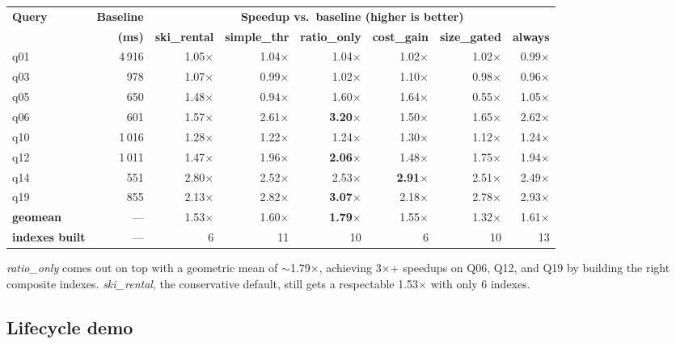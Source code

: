 \documentclass[10pt,a4paper]{article}
\begin{document}
\begin{table}[h]
\centering\small
\begin{tabular}{lrrrrrrr}
\toprule
\textbf{Query} & \textbf{Baseline} & \multicolumn{6}{c}{\textbf{Speedup vs.\ baseline (higher is better)}} \\
\cmidrule(lr){3-8}
                &  \textbf{(ms)} & \textbf{ski\_rental} & \textbf{simple\_thr} & \textbf{ratio\_only} & \textbf{cost\_gain} & \textbf{size\_gated} & \textbf{always} \\
\midrule
q01   & 4\,916  & 1.05$\times$ & 1.04$\times$ & 1.04$\times$ & 1.02$\times$ & 1.02$\times$ & 0.99$\times$ \\
q03   &   978   & 1.07$\times$ & 0.99$\times$ & 1.02$\times$ & 1.10$\times$ & 0.98$\times$ & 0.96$\times$ \\
q05   &   650   & 1.48$\times$ & 0.94$\times$ & 1.60$\times$ & 1.64$\times$ & 0.55$\times$ & 1.05$\times$ \\
q06   &   601   & 1.57$\times$ & 2.61$\times$ & \textbf{3.20$\times$} & 1.50$\times$ & 1.65$\times$ & 2.62$\times$ \\
q10   & 1\,016  & 1.28$\times$ & 1.22$\times$ & 1.24$\times$ & 1.30$\times$ & 1.12$\times$ & 1.24$\times$ \\
q12   & 1\,011  & 1.47$\times$ & 1.96$\times$ & \textbf{2.06$\times$} & 1.48$\times$ & 1.75$\times$ & 1.94$\times$ \\
q14   &   551   & 2.80$\times$ & 2.52$\times$ & 2.53$\times$ & \textbf{2.91$\times$} & 2.51$\times$ & 2.49$\times$ \\
q19   &   855   & 2.13$\times$ & 2.82$\times$ & \textbf{3.07$\times$} & 2.18$\times$ & 2.78$\times$ & 2.93$\times$ \\
\midrule
\textbf{geomean} & ---    & 1.53$\times$ & 1.60$\times$ & \textbf{1.79$\times$} & 1.55$\times$ & 1.32$\times$ & 1.61$\times$ \\
\textbf{indexes built} & --- & 6 & 11 & 10 & 6 & 10 & 13 \\
\bottomrule
\end{tabular}
\end{table}

\noindent
\emph{ratio\_only} comes out on top with a geometric mean of
$\sim$1.79$\times$, achieving 3$\times$+ speedups on Q06, Q12, and
Q19 by building the right composite indexes. \emph{ski\_rental},
the conservative default, still gets a respectable 1.53$\times$
with only 6 indexes.

\subsection*{Lifecycle demo}
\end{document}
